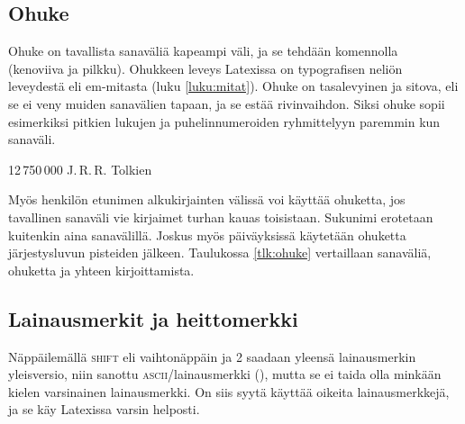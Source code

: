 \subsection{Ohuke}
\label{luku:ohuke}

Ohuke on tavallista sanaväliä kapeampi väli, ja se tehdään
komennolla~\koodi{\keno,} (kenoviiva ja pilkku). Ohukkeen leveys
Latexissa on  typografisen neliön leveydestä eli
em-mitasta (luku \ref{luku:mitat}). Ohuke on tasalevyinen ja sitova, eli
se ei veny muiden sanavälien tapaan, ja se estää rivinvaihdon. Siksi
ohuke sopii esimerkiksi pitkien lukujen ja puhelinnumeroiden
ryhmittelyyn paremmin kun sanaväli.

\begin{koodilohkosis}
  12\,750\,000
  J.\,R.\,R. Tolkien
\end{koodilohkosis}

Myös henkilön etunimen alkukirjainten välissä voi käyttää ohuketta, jos
tavallinen sanaväli vie kirjaimet turhan kauas toisistaan. Sukunimi
erotetaan kuitenkin aina sanavälillä. Joskus myös päiväyksissä käytetään
ohuketta järjestysluvun pisteiden jälkeen. Taulukossa \ref{tlk:ohuke}
vertaillaan sanaväliä, ohuketta ja yhteen kirjoittamista.


\subsection{Lainausmerkit ja heittomerkki}

Näppäilemällä \textsc{shift} eli vaihtonäppäin ja 2 saadaan yleensä
lainausmerkin yleisversio, niin sanottu \textsc{ascii}\-/lainausmerkki
(\textquotedbl), mutta se ei taida olla minkään kielen varsinainen
lainausmerkki. On siis syytä käyttää oikeita lainausmerkkejä, ja se käy
Latexissa varsin helposti.

